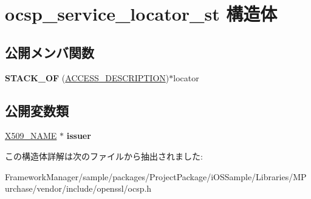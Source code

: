 \hypertarget{structocsp__service__locator__st}{}\section{ocsp\+\_\+service\+\_\+locator\+\_\+st 構造体}
\label{structocsp__service__locator__st}
\subsection*{公開メンバ関数}
\begin{DoxyCompactItemize}
\item 
\hypertarget{structocsp__service__locator__st_a40440677d41058a84492d23ff4d56e8d}{}{\bfseries S\+T\+A\+C\+K\+\_\+\+O\+F} (\hyperlink{struct_a_c_c_e_s_s___d_e_s_c_r_i_p_t_i_o_n__st}{A\+C\+C\+E\+S\+S\+\_\+\+D\+E\+S\+C\+R\+I\+P\+T\+I\+O\+N})$\ast$locator\label{structocsp__service__locator__st_a40440677d41058a84492d23ff4d56e8d}

\end{DoxyCompactItemize}
\subsection*{公開変数類}
\begin{DoxyCompactItemize}
\item 
\hypertarget{structocsp__service__locator__st_a223e62f217b2c10dd2502284591296ab}{}\hyperlink{struct_x509__name__st}{X509\+\_\+\+N\+A\+M\+E} $\ast$ {\bfseries issuer}\label{structocsp__service__locator__st_a223e62f217b2c10dd2502284591296ab}

\end{DoxyCompactItemize}


この構造体詳解は次のファイルから抽出されました\+:\begin{DoxyCompactItemize}
\item 
Framework\+Manager/sample/packages/\+Project\+Package/i\+O\+S\+Sample/\+Libraries/\+M\+Purchase/vendor/include/openssl/ocsp.\+h\end{DoxyCompactItemize}

